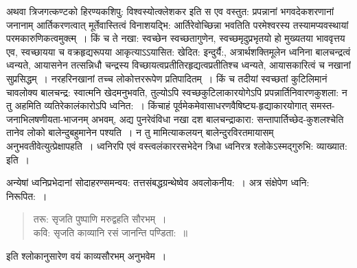{अथवा त्रिजगत्कण्टको हिरण्यकशिपु: विश्वस्योत्क्लेशकर इति स एव वस्तुत: प्रपन्नानां भगवदेकशरणानां जनानाम् आर्तिकरणत्वात् मूर्तेवास्तित्वं विनाशयद्भि: आर्तिरेवोच्छिन्ना भवतिति परमेश्वरस्य तस्यामप्यवस्थायां परमकारुणिकत्वमुक्त्म्~। किं च ते नखा: स्वच्छेन स्वच्छतागुणेन, स्वच्छमृदुप्रभृतयो हो मुख्यतया भाववृत्तय एव, स्वच्छायया च वक्रहृद्यरूपया आकृत्याऽऽयासित: खेदित: इन्दुर्यै:, अत्रार्थशक्तिमूलेन ध्वनिना बालचन्द्रत्वं ध्वन्यते, आयासनेन तत्सन्निधौ चन्द्रस्य विच्छायत्वप्रतीतिरहृद्यत्वप्रतीतिश्च ध्वन्यते, आयासकारित्वं च नखानां सुप्रसिद्धम्~। नरहरिनखानां तच्च लोकोत्तररूपेण प्रतिपादितम्~। किं च तदीयां स्वच्छतां कुटिलिमानं चावलोक्य बालचन्द्र: स्वात्मनि खेदमनुभवति, तुल्योऽपि स्वच्छकुटिलाकारयोगेऽपि प्रपन्नार्तिनिवारणकुशला: न तु अहमिति व्यतिरेकालंकारोऽपि ध्वनित:~। किंचाहं पूर्वमेकमेवासाधरणवैषिष्ट्य-हृद्याकारयोगात् समस्त-जनाभिलषणीयता-भाजनम् अभवम्, अद्य पुनरेवंविधा नखा दश बालचन्द्राकारा: सन्तापार्तिच्छेद-कुशलश्चेति तानेव लोको बालेन्दुबहुमानेन पश्यति~। न तु मामित्याकलयन् बालेन्दुरविरतमायासम् अनुभवतीवेत्युत्प्रेक्षापहति~। ध्वनिरपि एवं वस्त्वलंकाररसभेदेन त्रिधा ध्वनिरत्र श्लोकेऽस्मद्गुरुभि: व्याख्यात: इति~। 

अन्येषां ध्वनिप्रभेदानां सोदाहरण्समन्वय: तत्तसंबद्धग्रन्थेष्वेव अवलोकनीय:~। अत्र संक्षेपेण ध्वनि: निरूपित:~। 
\vskip -1cm

\begin{verse}
तरू: सृजति पुष्पाणि मरुद्वहति सौरभम्~। \\
कवि: सृजति काव्यानि रसं जानन्ति पण्डिता:~॥
\end{verse}
इति श्लोकानुसारेण वयं काव्यसौरभम् अनुभवेम~। 
\vskip -10pt

\articleend
}
